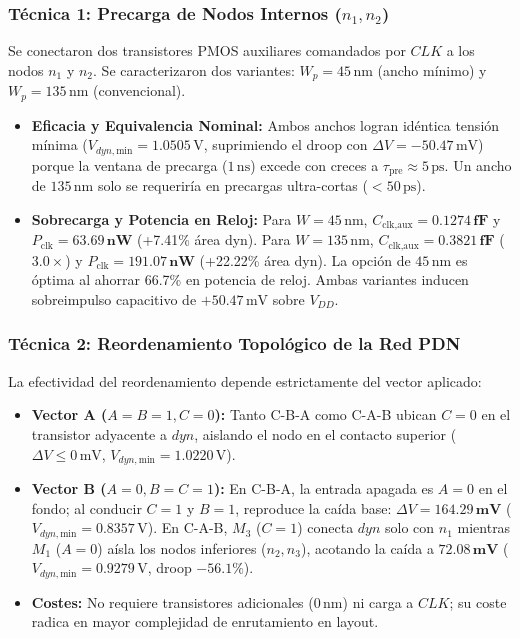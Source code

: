 \subsubsection{Técnica 1: Precarga de Nodos Internos (\texorpdfstring{$n_1, n_2$}{n1, n2})}
Se conectaron dos transistores PMOS auxiliares comandados por $CLK$ a los nodos $n_1$ y $n_2$. Se caracterizaron dos variantes: $W_p = 45\,\text{nm}$ (ancho mínimo) y $W_p = 135\,\text{nm}$ (convencional).
\begin{itemize}[leftmargin=1.4em,itemsep=0.03em]
  \item \textbf{Eficacia y Equivalencia Nominal:} Ambos anchos logran idéntica tensión mínima ($V_{dyn,\text{min}} = 1.0505\,\text{V}$, suprimiendo el droop con $\Delta V = -50.47\,\text{mV}$) porque la ventana de precarga ($1\,\text{ns}$) excede con creces a $\tau_{\text{pre}} \approx 5\,\text{ps}$. Un ancho de $135\,\text{nm}$ solo se requeriría en precargas ultra-cortas ($<50\,\text{ps}$).
  \item \textbf{Sobrecarga y Potencia en Reloj:} Para $W=45\,\text{nm}$, $C_{\text{clk,aux}} = \mathbf{0.1274\,\text{fF}}$ y $P_{\text{clk}} = \mathbf{63.69\,\text{nW}}$ (+7.41\% área dyn). Para $W=135\,\text{nm}$, $C_{\text{clk,aux}} = \mathbf{0.3821\,\text{fF}}$ ($3.0\times$) y $P_{\text{clk}} = \mathbf{191.07\,\text{nW}}$ (+22.22\% área dyn). La opción de $45\,\text{nm}$ es óptima al ahorrar 66.7\% en potencia de reloj. Ambas variantes inducen sobreimpulso capacitivo de $+50.47\,\text{mV}$ sobre $V_{DD}$.
\end{itemize}

\subsubsection{Técnica 2: Reordenamiento Topológico de la Red PDN}
La efectividad del reordenamiento depende estrictamente del vector aplicado:
\begin{itemize}[leftmargin=1.4em,itemsep=0.03em]
  \item \textbf{Vector A ($A=B=1, C=0$):} Tanto C-B-A como C-A-B ubican $C=0$ en el transistor adyacente a $dyn$, aislando el nodo en el contacto superior ($\Delta V \le 0\,\text{mV}$, $V_{dyn,\text{min}} = 1.0220\,\text{V}$).
  \item \textbf{Vector B ($A=0, B=C=1$):} En C-B-A, la entrada apagada es $A=0$ en el fondo; al conducir $C=1$ y $B=1$, reproduce la caída base: $\Delta V = \mathbf{164.29\,\text{mV}}$ ($V_{dyn,\text{min}} = 0.8357\,\text{V}$). En C-A-B, $M_3$ ($C=1$) conecta $dyn$ solo con $n_1$ mientras $M_1$ ($A=0$) aísla los nodos inferiores ($n_2, n_3$), acotando la caída a $\mathbf{72.08\,\text{mV}}$ ($V_{dyn,\text{min}} = 0.9279\,\text{V}$, droop $-56.1\%$).
  \item \textbf{Costes:} No requiere transistores adicionales ($0\,\text{nm}$) ni carga a $CLK$; su coste radica en mayor complejidad de enrutamiento en layout.
\end{itemize}


